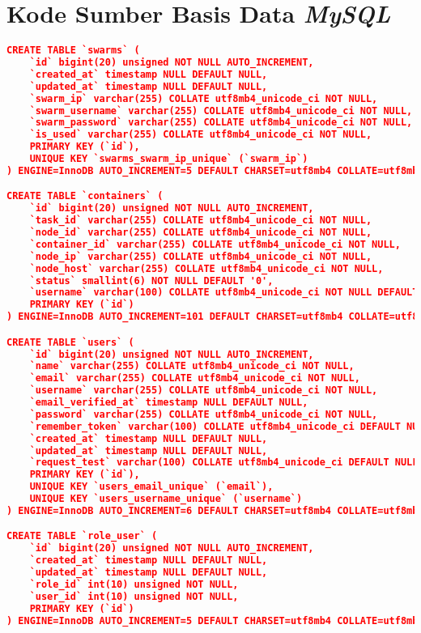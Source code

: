 \section*{Kode Sumber Basis Data \textit{MySQL}} \label{mysql}
	
\begin{lstlisting}[frame=single,tabsize=2,breaklines,caption={Basis data MySQL},label=mysql, captionpos=b, language=json]
CREATE TABLE `swarms` (
	`id` bigint(20) unsigned NOT NULL AUTO_INCREMENT,
	`created_at` timestamp NULL DEFAULT NULL,
	`updated_at` timestamp NULL DEFAULT NULL,
	`swarm_ip` varchar(255) COLLATE utf8mb4_unicode_ci NOT NULL,
	`swarm_username` varchar(255) COLLATE utf8mb4_unicode_ci NOT NULL,
	`swarm_password` varchar(255) COLLATE utf8mb4_unicode_ci NOT NULL,
	`is_used` varchar(255) COLLATE utf8mb4_unicode_ci NOT NULL,
	PRIMARY KEY (`id`),
	UNIQUE KEY `swarms_swarm_ip_unique` (`swarm_ip`)
) ENGINE=InnoDB AUTO_INCREMENT=5 DEFAULT CHARSET=utf8mb4 COLLATE=utf8mb4_unicode_ci;

CREATE TABLE `containers` (
	`id` bigint(20) unsigned NOT NULL AUTO_INCREMENT,
	`task_id` varchar(255) COLLATE utf8mb4_unicode_ci NOT NULL,
	`node_id` varchar(255) COLLATE utf8mb4_unicode_ci NOT NULL,
	`container_id` varchar(255) COLLATE utf8mb4_unicode_ci NOT NULL,
	`node_ip` varchar(255) COLLATE utf8mb4_unicode_ci NOT NULL,
	`node_host` varchar(255) COLLATE utf8mb4_unicode_ci NOT NULL,
	`status` smallint(6) NOT NULL DEFAULT '0',
	`username` varchar(100) COLLATE utf8mb4_unicode_ci NOT NULL DEFAULT '0',
	PRIMARY KEY (`id`)
) ENGINE=InnoDB AUTO_INCREMENT=101 DEFAULT CHARSET=utf8mb4 COLLATE=utf8mb4_unicode_ci;

CREATE TABLE `users` (
	`id` bigint(20) unsigned NOT NULL AUTO_INCREMENT,
	`name` varchar(255) COLLATE utf8mb4_unicode_ci NOT NULL,
	`email` varchar(255) COLLATE utf8mb4_unicode_ci NOT NULL,
	`username` varchar(255) COLLATE utf8mb4_unicode_ci NOT NULL,
	`email_verified_at` timestamp NULL DEFAULT NULL,
	`password` varchar(255) COLLATE utf8mb4_unicode_ci NOT NULL,
	`remember_token` varchar(100) COLLATE utf8mb4_unicode_ci DEFAULT NULL,
	`created_at` timestamp NULL DEFAULT NULL,
	`updated_at` timestamp NULL DEFAULT NULL,
	`request_test` varchar(100) COLLATE utf8mb4_unicode_ci DEFAULT NULL,
	PRIMARY KEY (`id`),
	UNIQUE KEY `users_email_unique` (`email`),
	UNIQUE KEY `users_username_unique` (`username`)
) ENGINE=InnoDB AUTO_INCREMENT=6 DEFAULT CHARSET=utf8mb4 COLLATE=utf8mb4_unicode_ci;

CREATE TABLE `role_user` (
	`id` bigint(20) unsigned NOT NULL AUTO_INCREMENT,
	`created_at` timestamp NULL DEFAULT NULL,
	`updated_at` timestamp NULL DEFAULT NULL,
	`role_id` int(10) unsigned NOT NULL,
	`user_id` int(10) unsigned NOT NULL,
	PRIMARY KEY (`id`)
) ENGINE=InnoDB AUTO_INCREMENT=5 DEFAULT CHARSET=utf8mb4 COLLATE=utf8mb4_unicode_ci;


\end{lstlisting}
